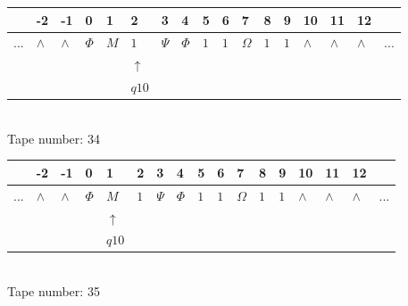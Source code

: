 \documentclass[11pt]{article}
\begin{document}
\begin{table}[H]
\centering
\begin{tabular}{lllllllllllllllll}
 & -2 & -1 & 0 & 1 & 2 & 3 & 4 & 5 & 6 & 7 & 8 & 9 & 10 & 11 & 12 & \\
\hline
$...$ & \multicolumn{1}{|l|}{$\wedge$} & \multicolumn{1}{|l|}{$\wedge$} & \multicolumn{1}{|l|}{$\Phi$} & \multicolumn{1}{|l|}{$M$} & \multicolumn{1}{|l|}{$1$} & \multicolumn{1}{|l|}{$\Psi$} & \multicolumn{1}{|l|}{$\Phi$} & \multicolumn{1}{|l|}{$1$} & \multicolumn{1}{|l|}{$1$} & \multicolumn{1}{|l|}{$\Omega$} & \multicolumn{1}{|l|}{$1$} & \multicolumn{1}{|l|}{$1$} & \multicolumn{1}{|l|}{$\wedge$} & \multicolumn{1}{|l|}{$\wedge$} & \multicolumn{1}{|l|}{$\wedge$} & $...$\\
\hline
&  &  &  &  & $\uparrow$ &  &  &  &  &  &  &  &  &  &  &  \\
&  &  &  &  & $ q10 $ &  &  &  &  &  &  &  &  &  &  &  \\
\end{tabular}
\\
Tape number: 34
\noindent\makebox[\linewidth]{\hdashrule{\textwidth}{1pt}{1pt}}\end{table}

\begin{table}[H]
\centering
\begin{tabular}{lllllllllllllllll}
 & -2 & -1 & 0 & 1 & 2 & 3 & 4 & 5 & 6 & 7 & 8 & 9 & 10 & 11 & 12 & \\
\hline
$...$ & \multicolumn{1}{|l|}{$\wedge$} & \multicolumn{1}{|l|}{$\wedge$} & \multicolumn{1}{|l|}{$\Phi$} & \multicolumn{1}{|l|}{$M$} & \multicolumn{1}{|l|}{$1$} & \multicolumn{1}{|l|}{$\Psi$} & \multicolumn{1}{|l|}{$\Phi$} & \multicolumn{1}{|l|}{$1$} & \multicolumn{1}{|l|}{$1$} & \multicolumn{1}{|l|}{$\Omega$} & \multicolumn{1}{|l|}{$1$} & \multicolumn{1}{|l|}{$1$} & \multicolumn{1}{|l|}{$\wedge$} & \multicolumn{1}{|l|}{$\wedge$} & \multicolumn{1}{|l|}{$\wedge$} & $...$\\
\hline
&  &  &  & $\uparrow$ &  &  &  &  &  &  &  &  &  &  &  &  \\
&  &  &  & $ q10 $ &  &  &  &  &  &  &  &  &  &  &  &  \\
\end{tabular}
\\
Tape number: 35
\noindent\makebox[\linewidth]{\hdashrule{\textwidth}{1pt}{1pt}}\end{table}
\clearpage
\end{document}
